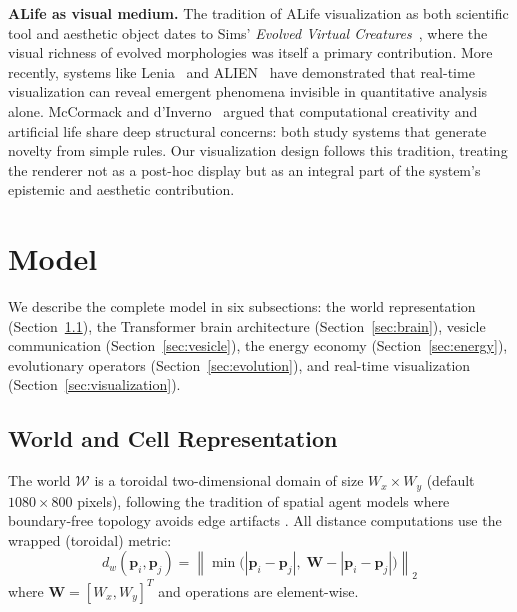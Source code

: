 \documentclass[10pt,twocolumn]{article}
\begin{document}
\textbf{ALife as visual medium.}
The tradition of ALife visualization as both scientific tool and aesthetic object dates to Sims' \emph{Evolved Virtual Creatures}~\cite{sims1994evolving}, where the visual richness of evolved morphologies was itself a primary contribution.
More recently, systems like Lenia~\cite{chan2019lenia} and ALIEN~\cite{alien2024} have demonstrated that real-time visualization can reveal emergent phenomena invisible in quantitative analysis alone.
McCormack and d'Inverno~\cite{mccormack2012computers} argued that computational creativity and artificial life share deep structural concerns: both study systems that generate novelty from simple rules.
Our visualization design follows this tradition, treating the renderer not as a post-hoc display but as an integral part of the system's epistemic and aesthetic contribution.


\section{Model}
\label{sec:model}

We describe the complete model in six subsections: the world representation (Section~\ref{sec:world}), the Transformer brain architecture (Section~\ref{sec:brain}), vesicle communication (Section~\ref{sec:vesicle}), the energy economy (Section~\ref{sec:energy}), evolutionary operators (Section~\ref{sec:evolution}), and real-time visualization (Section~\ref{sec:visualization}).

\subsection{World and Cell Representation}
\label{sec:world}

The world $\mathcal{W}$ is a toroidal two-dimensional domain of size $W_x \times W_y$ (default $1080 \times 800$ pixels), following the tradition of spatial agent models where boundary-free topology avoids edge artifacts \cite{reynolds1987flocks,vicsek1995novel}.
All distance computations use the wrapped (toroidal) metric:
\begin{equation}
  d_w(\mathbf{p}_i, \mathbf{p}_j) = \left\| \min\!\big(|\mathbf{p}_i - \mathbf{p}_j|,\; \mathbf{W} - |\mathbf{p}_i - \mathbf{p}_j|\big) \right\|_2
\end{equation}
where $\mathbf{W} = [W_x, W_y]^T$ and operations are element-wise.
\end{document}
